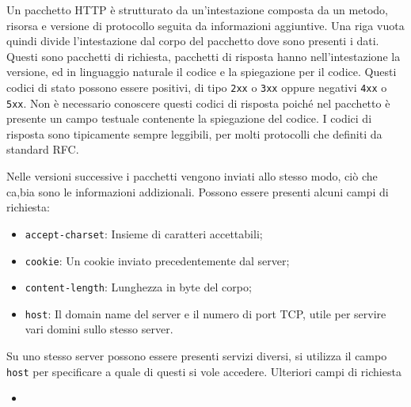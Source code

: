\documentclass{article}
\numberwithin{equation}{subsection}
\begin{document}
Un pacchetto HTTP è strutturato da un'intestazione composta da un metodo, risorsa e versione di protocollo 
seguita da informazioni aggiuntive. Una riga vuota quindi divide l'intestazione dal corpo del pacchetto dove sono presenti i dati. 
Questi sono pacchetti di richiesta, pacchetti di risposta hanno nell'intestazione la versione, ed in linguaggio naturale il codice e la spiegazione per 
il codice. 
Questi codici di stato possono essere positivi, di tipo \verb|2xx| o \verb|3xx| oppure negativi \verb|4xx| o \verb|5xx|. Non è necessario conoscere questi codici di 
risposta poiché nel pacchetto è presente un campo testuale contenente la spiegazione del codice. 
I codici di risposta sono tipicamente sempre leggibili, per molti protocolli che definiti da standard RFC. 

Nelle versioni successive i pacchetti vengono inviati allo stesso modo, ciò che ca,bia sono le informazioni addizionali. 
Possono essere presenti alcuni campi di richiesta:
\begin{itemize}
    \item \verb|accept-charset|: Insieme di caratteri accettabili;
    \item \verb|cookie|: Un cookie inviato precedentemente dal server;
    \item \verb|content-length|: Lunghezza in byte del corpo;
    \item \verb|host|: Il domain name del server e il numero di port TCP, utile per servire vari domini sullo stesso server. 
\end{itemize}

Su uno stesso server possono essere presenti servizi diversi, si utilizza il campo \verb|host| per specificare a quale di questi si vole accedere. 
Ulteriori campi di richiesta
\begin{itemize}
    \item 
\end{itemize}

\end{document}
